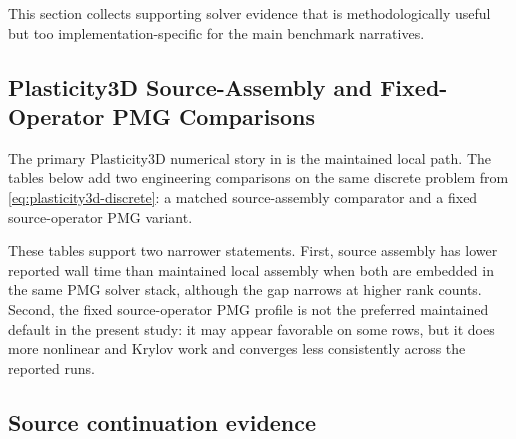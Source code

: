 \label{sec:solver-evidence}

This section collects supporting solver evidence that is methodologically useful
but too implementation-specific for the main benchmark narratives.

\subsection{Plasticity3D Source-Assembly and Fixed-Operator PMG Comparisons}

The primary Plasticity3D numerical story in  is the
maintained local path. The tables below add two engineering comparisons on the
same discrete problem from \cref{eq:plasticity3d-discrete}: a matched
source-assembly comparator and a fixed source-operator PMG variant.

\begin{table}[H]
  \centering
  
  \caption{Matched local-vs-source comparison for the same local PMG solver
  stack. At each listed rank the local and source rows converge in the same
  number of nonlinear and linear iterations, so this is a timing-only
  comparison on \cref{eq:plasticity3d-discrete}.}
  \label{tab:plasticity3d-local-vs-source}
\end{table}

\begin{table}[H]
  \centering
  
  \caption{Fixed source-operator PMG alternative on the same Plasticity3D
  problem. The status column distinguishes completed rows from rank counts
  that hit the Newton cap before reaching the promoted gradient target.}
  \label{tab:plasticity3d-fixed-source-pmg}
\end{table}

These tables support two narrower statements. First, source assembly has lower
reported wall time than maintained local assembly when both are embedded in the
same PMG solver stack, although the gap narrows at higher rank counts. Second,
the fixed source-operator PMG profile is not the preferred maintained default in the
present study: it may appear favorable on some rows, but it does more nonlinear
and Krylov work and converges less consistently across the reported runs.

\subsection{Source continuation evidence}


